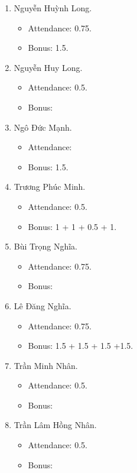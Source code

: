 \documentclass{article}
\begin{document}
\begin{enumerate}
\begin{itemize}
    \end{itemize}
    \item {\sc Nguyễn Huỳnh Long.}
    \begin{itemize}
        \item Attendance: 0.75.
        \item Bonus: 1.5.
    \end{itemize}
    \item {\sc Nguyễn Huy Long.}
    \begin{itemize}
        \item Attendance: 0.5.
        \item Bonus:
    \end{itemize}
    \item {\sc Ngô Đức Mạnh.}
    \begin{itemize}
        \item Attendance:
        \item Bonus: 1.5.
    \end{itemize}
    \item {\sc Trương Phúc Minh.}
    \begin{itemize}
        \item Attendance: 0.5.
        \item Bonus: 1 + 1 + 0.5 + 1.
    \end{itemize}
    \item {\sc Bùi Trọng Nghĩa.}
    \begin{itemize}
        \item Attendance: 0.75.
        \item Bonus:
    \end{itemize}
    \item {\sc Lê Đăng Nghĩa.}
    \begin{itemize}
        \item Attendance: 0.75.
        \item Bonus: 1.5 + 1.5 + 1.5 +1.5.
    \end{itemize}
    \item {\sc Trần Minh Nhân.}
    \begin{itemize}
        \item Attendance: 0.5.
        \item Bonus:
    \end{itemize}
    \item {\sc Trần Lâm Hồng Nhân.}
    \begin{itemize}
        \item Attendance: 0.5.
        \item Bonus:

\end{itemize}
\end{enumerate}
\end{document}
